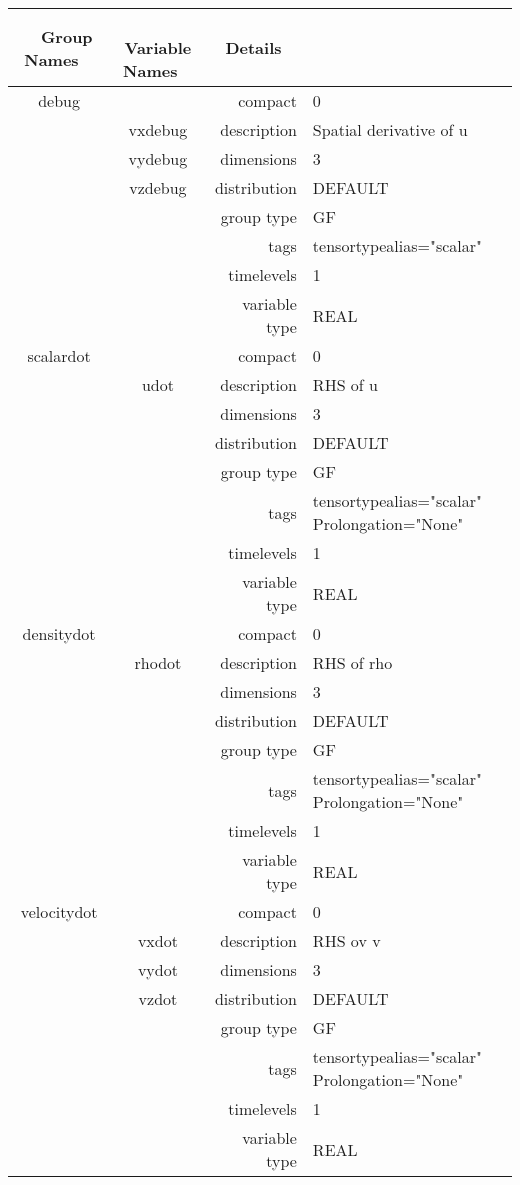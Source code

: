 \begin{tabular*}{150mm}{|c|c@{\extracolsep{\fill}}|rl|} \hline 
~ {\bf Group Names} ~ & ~ {\bf Variable Names} ~  &{\bf Details} ~ & ~ \\ 
\hline 
debug &  & compact & 0 \\ 
 & vxdebug & description & Spatial derivative of u \\ 
 & vydebug & dimensions & 3 \\ 
 & vzdebug & distribution & DEFAULT \\ 
 &  & group type & GF \\ 
 &  & tags & tensortypealias="scalar" \\ 
 &  & timelevels & 1 \\ 
 &  & variable type & REAL \\ 
\hline 
scalardot &  & compact & 0 \\ 
 & udot & description & RHS of u \\ 
 &  & dimensions & 3 \\ 
 &  & distribution & DEFAULT \\ 
 &  & group type & GF \\ 
 &  & tags & tensortypealias="scalar" Prolongation="None" \\ 
 &  & timelevels & 1 \\ 
 &  & variable type & REAL \\ 
\hline 
densitydot &  & compact & 0 \\ 
 & rhodot & description & RHS of rho \\ 
 &  & dimensions & 3 \\ 
 &  & distribution & DEFAULT \\ 
 &  & group type & GF \\ 
 &  & tags & tensortypealias="scalar" Prolongation="None" \\ 
 &  & timelevels & 1 \\ 
 &  & variable type & REAL \\ 
\hline 
velocitydot &  & compact & 0 \\ 
 & vxdot & description & RHS ov v \\ 
 & vydot & dimensions & 3 \\ 
 & vzdot & distribution & DEFAULT \\ 
 &  & group type & GF \\ 
 &  & tags & tensortypealias="scalar" Prolongation="None" \\ 
 &  & timelevels & 1 \\ 
 &  & variable type & REAL \\ 

\end{tabular*}
